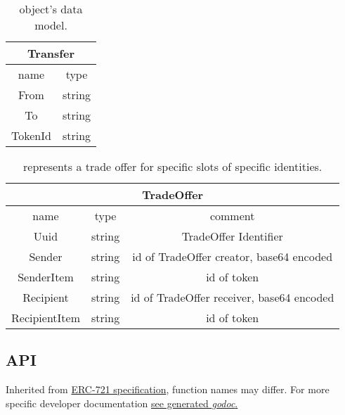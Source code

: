 \begin{center}
  \begin{table}[!ht]
    \centering
    \begin{tabular}{| c | c |}
      \hline
      \multicolumn{2}{|c|}{Transfer} \\
      \hline
      name    & type                 \\
      \hline
      From    & string               \\
      To      & string               \\
      TokenId & string               \\
      \hline
    \end{tabular}
    \caption{ object's data model.}
  \end{table}
\end{center}

\begin{center}
  \begin{table}[!ht]
    \centering
    \begin{tabular}{|c|c|c|}
      \hline
      \multicolumn{3}{|c|}{TradeOffer}                                   \\
      \hline
      name          & type   & comment                                   \\
      \hline
      Uuid          & string & TradeOffer Identifier                     \\
      Sender        & string & id of TradeOffer creator, base64 encoded  \\
      SenderItem    & string & id of token                               \\
      Recipient     & string & id of TradeOffer receiver, base64 encoded \\
      RecipientItem & string & id of token                               \\
      \hline
    \end{tabular}
    \caption{ represents a trade offer for specific slots of specific identities.}
  \end{table}
\end{center}

\newpage
\subsection{API}
Inherited from \href{https://eips.ethereum.org/EIPS/eip-721}{ERC-721 specification}, function names may differ. For more specific developer documentation \href{https://pkg.go.dev/github.com/perryd01/vaccination-slot/chaincode#section-documentation}{see generated \emph{godoc}.}
